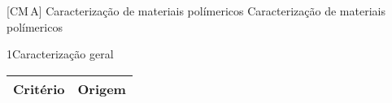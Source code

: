 \documentclass[\mainfilename]{subfiles}
\begin{document}

[CM\,A]
{Caracterização de materiais polímericos} %
{Caracterização de materiais polímericos} %

\begin{sectionBox}1{Caracterização geral} %
    
    \begin{center}
        \setlength\tabcolsep{3mm} %
        \vspace{1ex}
        \begin{tabular}{l l}
            \toprule
            
                \multicolumn{1}{c}{Critério}
                & \multicolumn{1}{c}{Origem}
            
            \\\midrule
            

\end{tabular}
\end{center}
\end{sectionBox}
\end{document}
